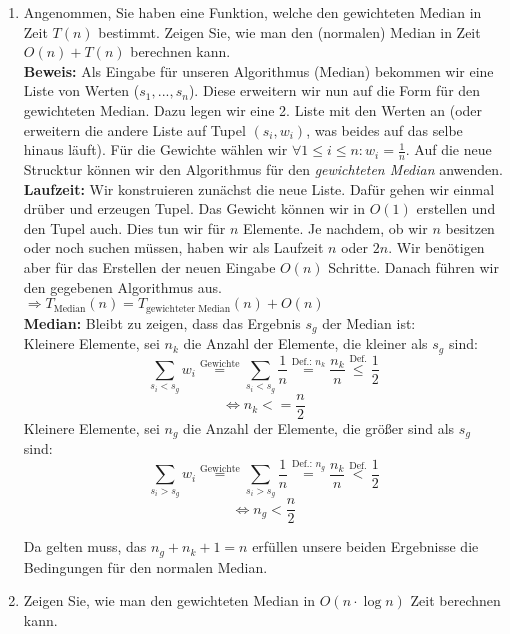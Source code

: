 \documentclass[11pt,a4paper,ngerman]{article}
\begin{document}
\begin{enumerate}[\bfseries (a)]

\item Angenommen, Sie haben eine Funktion, welche den gewichteten Median in Zeit $T(n)$ bestimmt. Zeigen Sie, wie man den (normalen) Median in Zeit $O(n) + T(n)$ berechnen kann.\\

\textbf{Beweis:} Als Eingabe für unseren Algorithmus (Median) bekommen wir eine Liste von Werten ($s_1, ..., s_n$). Diese erweitern wir nun auf die Form für den gewichteten Median. Dazu legen wir eine 2. Liste mit den Werten an (oder erweitern die andere Liste auf Tupel $(s_i, w_i)$, was beides auf das selbe hinaus läuft). Für die Gewichte wählen wir $\forall 1\leq i \leq n : w_i = \frac{1}{n}$. Auf die neue Strucktur können wir den Algorithmus für den \emph{gewichteten Median} anwenden.\\

\textbf{Laufzeit:} Wir konstruieren zunächst die neue Liste. Dafür gehen wir einmal drüber und erzeugen Tupel. Das Gewicht können wir in $O(1)$ erstellen und den Tupel auch. Dies tun wir für $n$ Elemente. Je nachdem, ob wir $n$ besitzen oder noch suchen müssen, haben wir als Laufzeit $n$ oder $2n$. Wir benötigen aber für das Erstellen der neuen Eingabe $O(n)$ Schritte. Danach führen wir den gegebenen Algorithmus aus.\\
$\Rightarrow T_{\text{Median}}(n) = T_{\text{gewichteter Median}}(n) + O(n)$\\

\textbf{Median:} Bleibt zu zeigen, dass das Ergebnis $s_g$ der Median ist:\\
Kleinere Elemente, sei $n_k$ die Anzahl der Elemente, die kleiner als $s_g$ sind:
$$
\sum_{s_i < s_g} w_i \stackrel{\text{Gewichte}}{=} \sum_{s_i< s_g} \frac{1}{n} \stackrel{\text{Def.: }n_k}{=} \frac{n_k}{n} \stackrel{\text{Def.}}{\leq} \frac{1}{2} 
$$
$$
\Leftrightarrow n_k <= \frac{n}{2}
$$
Kleinere Elemente, sei $n_g$ die Anzahl der Elemente, die größer sind als $s_g$ sind:
$$
\sum_{s_i > s_g} w_i \stackrel{\text{Gewichte}}{=} \sum_{s_i> s_g} \frac{1}{n} \stackrel{\text{Def.: }n_g}{=} \frac{n_k}{n} \stackrel{\text{Def.}}{<} \frac{1}{2}
$$
$$
\Leftrightarrow n_g < \frac{n}{2}
$$

Da gelten muss, das $n_g + n_k + 1 = n$ erfüllen unsere beiden Ergebnisse die Bedingungen für den normalen Median.
\item  Zeigen Sie, wie man den gewichteten Median in $O(n \cdot \log n)$ Zeit berechnen kann.\\


\end{enumerate}
\end{document}
